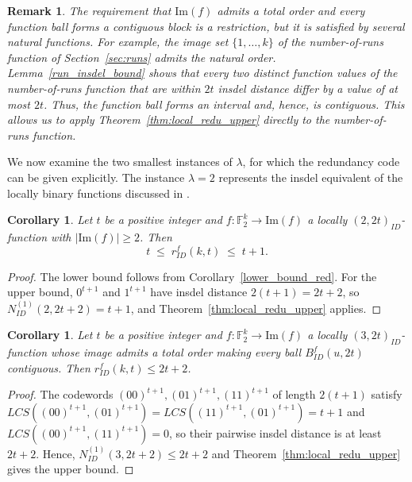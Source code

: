 \documentclass[11 pt]{article}
\numberwithin{equation}{section}
\newtheorem{corollary}[theorem]{Corollary}
\newtheorem{remark}[theorem]{Remark}
\begin{document}
    \begin{remark}
    \label{rmk:scope-of-thm74}
    The requirement that $\mathrm{Im}(f)$ admits a total order and every function ball forms a contiguous block is a restriction, but it is satisfied by several natural functions. For example, the image set $\{1,\dots,k\}$ of the number-of-runs function of Section~\ref{sec:runs} admits the natural order. Lemma~\ref{run_insdel_bound} shows that every two distinct function values of the number-of-runs function that are within $2t$ insdel distance differ by a value of at most $2t$. Thus, the function ball forms an interval and, hence, is contiguous. This allows us to apply Theorem~\ref{thm:local_redu_upper} directly to the number-of-runs function.
    \end{remark}

    We now examine the two smallest instances of $\lambda$, for which the redundancy code can be given explicitly. The instance $\lambda=2$ represents the insdel equivalent of the locally binary functions discussed in \cite{10132545}.
    
    \begin{corollary}
    Let $t$ be a positive integer and $f: \mathbb{F}_2^k \rightarrow \mathrm{Im}(f)$ a locally $(2, 2t)_{ID}$-function with $|\mathrm{Im}(f)| \geq 2$. Then
    \[
    t \;\leq\; r_{ID}^f(k,t) \;\leq\; t+1.
    \]
    \end{corollary}
    
    \begin{proof}
    The lower bound follows from Corollary~\ref{lower_bound_red}. For the upper bound, $0^{t+1}$ and $1^{t+1}$ have insdel distance $2(t+1)=2t+2$, so $N^{(1)}_{ID}(2,2t+2)=t+1$, and Theorem~\ref{thm:local_redu_upper} applies.
    \end{proof}
    
    

    \begin{corollary}
    \label{local-3-upper}
    Let $t$ be a positive integer and $f: \mathbb{F}_2^k \rightarrow \mathrm{Im}(f)$ a locally $(3, 2t)_{ID}$-function whose image admits a total order making every ball $B^f_{ID}(u,2t)$ contiguous. Then $r^{f}_{ID}(k, t) \leq 2t+2$.
    \end{corollary}
    \begin{proof}
    The codewords $(00)^{t+1},(01)^{t+1},(11)^{t+1}$ of length $2(t+1)$ satisfy $LCS((00)^{t+1},(01)^{t+1})=LCS((11)^{t+1},(01)^{t+1})=t+1$ and $LCS((00)^{t+1},(11)^{t+1})=0$, so their pairwise insdel distance is at least $2t+2$. Hence, $N^{(1)}_{ID}(3,2t+2)\leq 2t+2$ and Theorem~\ref{thm:local_redu_upper} gives the upper bound.
    \end{proof}
\end{document}
